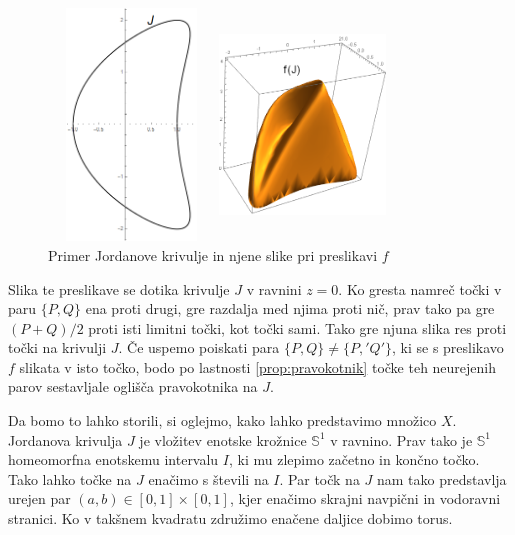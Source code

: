 \documentclass[mat1]{fmfdelo}
\begin{document}
\begin{figure}[h!]
\begin{minipage}{0.45\textwidth}
	\centering
	\includegraphics[width = 125pt, height = 175pt]{primer_krivulje.png}
\end{minipage}\hfill
\begin{minipage}{0.45\textwidth}
	\centering
	\includegraphics[width = 125pt, height = 175pt]{primer_f_krivulje.png}
\end{minipage}
\caption{Primer Jordanove krivulje in njene slike pri preslikavi $f$}
\end{figure}

Slika te preslikave se dotika krivulje $J$ v ravnini $z=0$. Ko gresta namreč točki v paru $\{P, Q\}$ ena proti drugi, gre razdalja med njima proti nič, prav tako pa gre $(P+Q)/2$ proti isti limitni točki, kot točki sami. Tako gre njuna slika res proti točki na krivulji $J$.
Če uspemo poiskati para $\{P, Q\} \neq \{P,' Q'\}$, ki se s preslikavo $f$ slikata v isto točko, bodo po lastnosti \eqref{prop:pravokotnik} točke teh neurejenih parov sestavljale oglišča pravokotnika na $J$.

Da bomo to lahko storili, si oglejmo, kako lahko predstavimo množico $X$. Jordanova krivulja $J$ je vložitev enotske krožnice $\mathbb{S}^1$ v ravnino. Prav tako je $\mathbb{S}^1$ homeomorfna enotskemu intervalu $I$, ki mu zlepimo začetno in končno točko. Tako lahko točke na $J$ enačimo s števili na $I$. Par točk na $J$ nam tako predstavlja urejen par $(a, b) \in [0, 1] \times [0, 1]$, kjer enačimo skrajni navpični in vodoravni stranici. Ko v takšnem kvadratu združimo enačene daljice dobimo torus.
\end{document}
